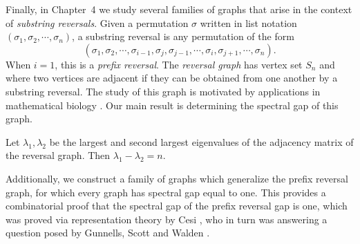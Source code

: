 Finally, in Chapter~4 we study several families of graphs that arise in the context
of \textit{substring reversals}.  Given a permutation $\sigma$ written in list notation
$(\sigma_1, \sigma_2, \cdots, \sigma_n)$, a substring reversal is any permutation
of the form
\[ (\sigma_1, \sigma_2, \cdots, \sigma_{i-1}, \sigma_j, \sigma_{j-1}, \cdots, \sigma_{i}, \sigma_{j+1}, \cdots, \sigma_n) .\]
When $i = 1$, this is a \textit{prefix reversal}.  The \textit{reversal graph} has vertex set $S_n$
and where two vertices are adjacent if they can be obtained from one another by a substring reversal.
The study of this graph is motivated by applications in mathematical biology \cite{BafnaPevzner1996}.
Our main result is determining the spectral gap of this graph.
\begin{theorem}
  Let $\lambda_1, \lambda_2$ be the largest and second largest eigenvalues
  of the adjacency matrix of the reversal graph.  Then $\lambda_1 - \lambda_2 = n$.
\end{theorem}
\noindent Additionally, we construct a family of graphs which generalize the prefix reversal graph,
for which every graph has spectral gap equal to one.  This provides a combinatorial
proof that the spectral gap of the prefix reversal gap is one, which was proved via
representation theory by Cesi \cite{Cesi2009}, who in turn was answering a question
posed by Gunnells, Scott and Walden \cite{GunnellsEtAl2007}.









